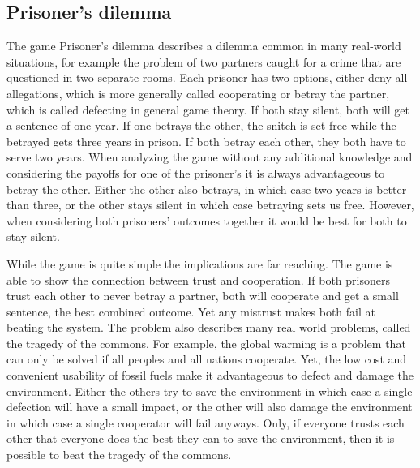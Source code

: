 \subsection{Prisoner's dilemma}
The game Prisoner's dilemma describes a dilemma common in many real-world situations, for
example the problem of two partners caught for a crime that are questioned in two separate rooms. 
Each prisoner has two options, either deny all allegations, which is more generally called cooperating
 or betray the partner, which is called defecting in general game theory. If both stay 
silent, both will get a sentence of one year. If one betrays the other, the snitch is set free while the 
betrayed gets three years in prison. If both betray each other, they both have to serve two years.
When analyzing the game without any additional knowledge and considering the payoffs for one of the
prisoner's it is always advantageous to betray the other. Either the other also betrays, in which case
two years is better than three, or the other stays silent in which case betraying sets us free. 
However, when considering both prisoners' outcomes together it would be best for both to stay silent.


While the game is quite simple the implications are far reaching. The game is able to show the 
connection between trust and cooperation. If both prisoners trust each other to never betray a 
partner, both will cooperate and get a small sentence, the best combined outcome. Yet any mistrust
makes both fail at beating the system. The problem also describes many real world problems, called 
the tragedy of the commons. For example, the global warming is a problem that can only be solved if
all peoples and all nations cooperate. Yet, the low cost and convenient usability of fossil fuels 
make it advantageous to defect and damage the environment. Either the others try to save the environment
in which case a single defection will have a small impact, or the other will also damage the environment
in which case a single cooperator will fail anyways. Only, if everyone trusts each other that
everyone does the best they can to save the environment, then it is possible to beat the tragedy 
of the commons.

